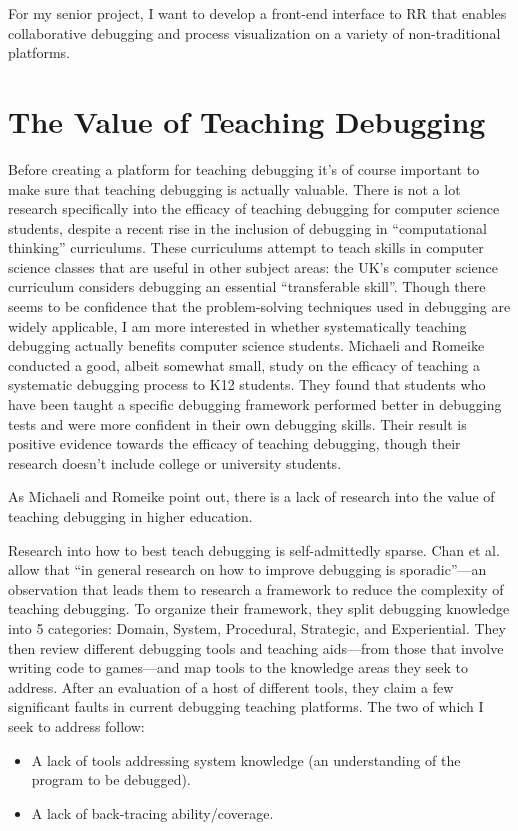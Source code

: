 \documentclass[12pt]{article}
\begin{document}
For my senior project, I want to develop a front-end interface to RR
that enables collaborative debugging and process visualization on a
variety of non-traditional platforms.

\section{The Value of Teaching Debugging}

Before creating a platform for teaching debugging it's of course
important to make sure that teaching debugging is actually valuable.
There is not a lot research specifically into the efficacy of teaching
debugging for computer science students, despite a recent rise in the
inclusion of debugging in ``computational thinking''
curriculums\cite{10.1145/3361721.3361724}.  These curriculums attempt
to teach skills in computer science classes that are useful in other
subject areas: the UK's computer science curriculum considers
debugging an essential ``transferable skill''\cite{10.1145/2602484}.
Though there seems to be confidence that the problem-solving
techniques used in debugging are widely applicable, I am more
interested in whether systematically teaching debugging actually
benefits computer science students.  Michaeli and Romeike conducted a
good, albeit somewhat small, study on the efficacy of teaching a
systematic debugging process to K12 students.  They found that
students who have been taught a specific debugging framework performed
better in debugging tests and were more confident in their own
debugging skills\cite{10.1145/3361721.3361724}.  Their result is
positive evidence towards the efficacy of teaching debugging, though
their research doesn't include college or university students.\par

As Michaeli and Romeike point out, there is a lack of research into
the value of teaching debugging in higher education.

Research into how to best teach debugging is self-admittedly sparse.
Chan et al. allow that ``in general research on how to improve
debugging is sporadic''---an observation that leads them to research a
framework to reduce the complexity of teaching
debugging\cite{10.1145/3286960.3286970}.  To organize their framework,
they split debugging knowledge into 5 categories: Domain, System,
Procedural, Strategic, and Experiential.  They then review different
debugging tools and teaching aids---from those that involve writing
code to games---and map tools to the knowledge areas they seek to
address.  After an evaluation of a host of different tools, they claim
a few significant faults in current debugging teaching platforms.  The
two of which I seek to address follow:
\begin{itemize}
\item A lack of tools addressing system knowledge (an understanding of
  the program to be debugged).
\item A lack of back-tracing ability/coverage.
\end{itemize}
\end{document}
